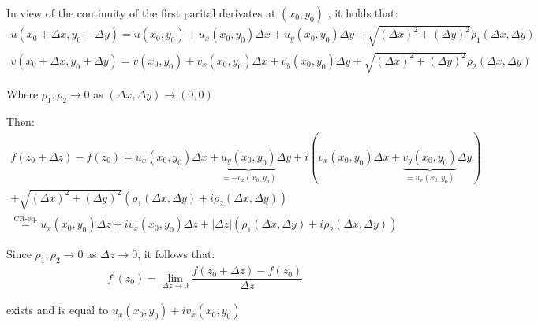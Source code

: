 \begin{prf}[]{}
  In view of the continuity of the first parital derivates at $(x_0,y_0)$ , it holds that:
  \begin{equation*}
    \begin{gathered}
      u(x_0+\Delta x,y_0+\Delta y) = u(x_0,y_0)+u_x(x_0,y_0)\Delta x + u_y(x_0,y_0)\Delta y + \sqrt{(\Delta x)^2+(\Delta y)^2}\rho_1(\Delta x,\Delta y)\\
      v(x_0+\Delta x,y_0+\Delta y) = v(x_0,y_0) + v_x(x_0,y_0)\Delta x+v_y(x_0,y_0)\Delta y + \sqrt{(\Delta x)^2+(\Delta y)^2}\rho_2(\Delta x,\Delta y)
    \end{gathered}
  \end{equation*}
  \par\bigskip
  \noindent Where $\rho_1,\rho_2\to0$ as $(\Delta x,\Delta y)\to(0,0)$
  \par\bigskip
  \noindent Then:
  \begin{equation*}
    \begin{gathered}
      f(z_0+\Delta z)-f(z_0) = u_x(x_0,y_0)\Delta x + \underbrace{u_y(x_0,y_0)}_{\text{$=-v_x(x_0,y_0)$}}\Delta y + i(v_x(x_0,y_0)\Delta x+\underbrace{v_y(x_0,y_0)}_{\text{$=u_x(x_0,y_0)$}}\Delta y)\\
      +\sqrt{(\Delta x)^2+(\Delta y)^2}(\rho_1(\Delta x,\Delta y)+i\rho_2(\Delta x,\Delta y))\\
      \stackrel{\text{CR-eq.}}{=} u_x(x_0,y_0)\Delta z + iv_x(x_0,y_0)\Delta z + \left|\Delta z\right|(\rho_1(\Delta x,\Delta y)+i\rho_2(\Delta x,\Delta y))
    \end{gathered}
  \end{equation*}
  \par\bigskip
  \noindent Since $\rho_1,\rho_2\to0$ as $\Delta z\to0$, it follows that:
  \begin{equation*}
    \begin{gathered}
      f^{\prime}(z_0) = \lim_{\Delta z\to0} \dfrac{f(z_0+\Delta z)-f(z_0)}{\Delta z}
    \end{gathered}
  \end{equation*}\par
  \noindent exists and is equal to $u_x(x_0,y_0)+iv_x(x_0,y_0)$ 
\end{prf}
\par\bigskip
